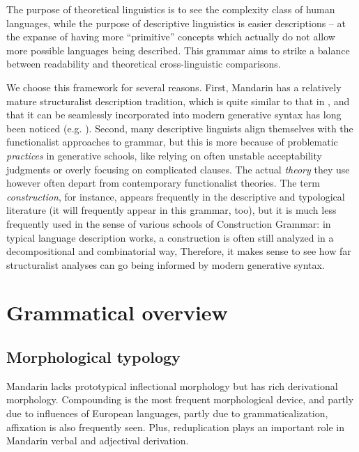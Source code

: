 \documentclass[UTF8, a4paper, oneside, scheme=plain, 12pt]{ctexrep}
\newcommand*{\term}[1]{\emph{#1}}
\begin{document}
{The purpose of theoretical linguistics is to see the complexity class of human languages,
while the purpose of descriptive linguistics is easier descriptions
-- at the expanse of having more ``primitive'' concepts
which actually do not allow more possible languages being described.
This grammar aims to strike a balance between readability and theoretical cross-linguistic comparisons.

We choose this framework for several reasons.
First, Mandarin has a relatively mature structuralist description tradition,
which is quite similar to that in \citet{cgel},
and that it can be seamlessly incorporated into modern generative syntax 
has long been noticed (e.g. \citealt{deng2010formal}).
Second, many descriptive linguists align themselves with the functionalist approaches to grammar,
but this is more because of problematic \emph{practices} in generative schools,
like relying on often unstable acceptability judgments
or overly focusing on complicated clauses.
The actual \emph{theory} they use however often depart from contemporary functionalist theories.
The term \term{construction}, for instance,
appears frequently in the descriptive and typological literature
(it will frequently appear in this grammar, too),
but it is much less frequently used in the sense of various schools of Construction Grammar:
in typical language description works, a construction is often still analyzed 
in a decompositional and combinatorial way,
Therefore, it makes sense to see how far structuralist analyses can go
being informed by modern generative syntax.


}





\chapter{Grammatical overview}

\section{Morphological typology}

Mandarin lacks prototypical inflectional morphology but has rich derivational morphology.
Compounding is the most frequent morphological device,
and partly due to influences of European languages, partly due to grammaticalization,
affixation is also frequently seen.
Plus, reduplication plays an important role in Mandarin verbal and adjectival derivation.
\end{document}
